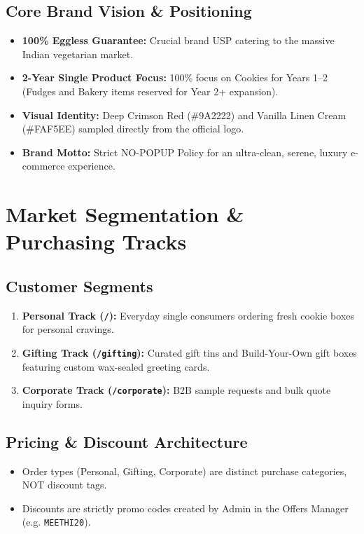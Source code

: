 \documentclass[11pt,a4paper]{article}
\begin{document}
\subsection{Core Brand Vision \& Positioning}
\begin{itemize}[leftmargin=*]
    \item \textbf{100\% Eggless Guarantee:} Crucial brand USP catering to the massive Indian vegetarian market.
    \item \textbf{2-Year Single Product Focus:} 100\% focus on Cookies for Years 1--2 (Fudges and Bakery items reserved for Year 2+ expansion).
    \item \textbf{Visual Identity:} Deep Crimson Red (\#9A2222) and Vanilla Linen Cream (\#FAF5EE) sampled directly from the official logo.
    \item \textbf{Brand Motto:} Strict NO-POPUP Policy for an ultra-clean, serene, luxury e-commerce experience.
\end{itemize}

\section{Market Segmentation \& Purchasing Tracks}
\subsection{Customer Segments}
\begin{enumerate}
    \item \textbf{Personal Track (\texttt{/}):} Everyday single consumers ordering fresh cookie boxes for personal cravings.
    \item \textbf{Gifting Track (\texttt{/gifting}):} Curated gift tins and Build-Your-Own gift boxes featuring custom wax-sealed greeting cards.
    \item \textbf{Corporate Track (\texttt{/corporate}):} B2B sample requests and bulk quote inquiry forms.
\end{enumerate}

\subsection{Pricing \& Discount Architecture}
\begin{itemize}
    \item Order types (Personal, Gifting, Corporate) are distinct purchase categories, NOT discount tags.
    \item Discounts are strictly promo codes created by Admin in the Offers Manager (e.g. \texttt{MEETHI20}).
\end{itemize}
\end{document}
